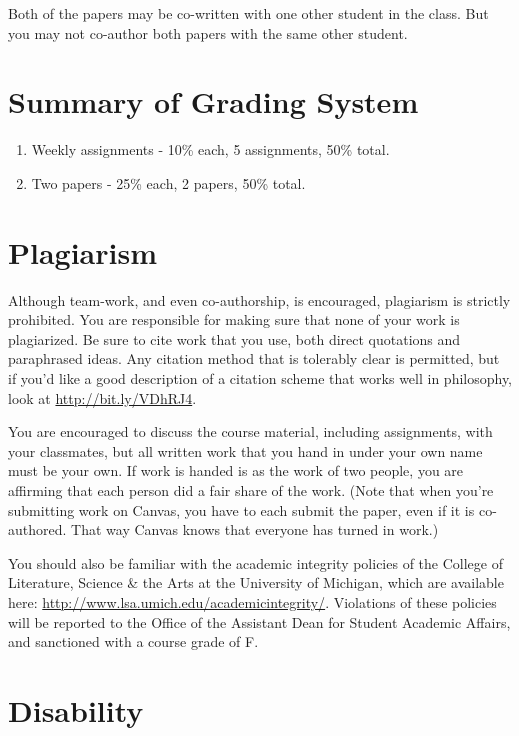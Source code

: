 \documentclass[
]{article}
\providecommand{\tightlist}{%
  \setlength{\itemsep}{0pt}\setlength{\parskip}{0pt}}
\begin{document}
Both of the papers may be co-written with one other student in the
class. But you may not co-author both papers with the same other
student.

\hypertarget{summary-of-grading-system}{%
\section{Summary of Grading System}\label{summary-of-grading-system}}

\begin{enumerate}
\def\labelenumi{\arabic{enumi}.}
\tightlist
\item
  Weekly assignments - 10\% each, 5 assignments, 50\% total.
\item
  Two papers - 25\% each, 2 papers, 50\% total.
\end{enumerate}

\newpage

\hypertarget{plagiarism}{%
\section{Plagiarism}\label{plagiarism}}

Although team-work, and even co-authorship, is encouraged, plagiarism is
strictly prohibited. You are responsible for making sure that none of
your work is plagiarized. Be sure to cite work that you use, both direct
quotations and paraphrased ideas. Any citation method that is tolerably
clear is permitted, but if you'd like a good description of a citation
scheme that works well in philosophy, look at
\url{http://bit.ly/VDhRJ4}.

You are encouraged to discuss the course material, including
assignments, with your classmates, but all written work that you hand in
under your own name must be your own. If work is handed is as the work
of two people, you are affirming that each person did a fair share of
the work. (Note that when you're submitting work on Canvas, you have to
each submit the paper, even if it is co-authored. That way Canvas knows
that everyone has turned in work.)

You should also be familiar with the academic integrity policies of the
College of Literature, Science \& the Arts at the University of
Michigan, which are available here:
\url{http://www.lsa.umich.edu/academicintegrity/}. Violations of these
policies will be reported to the Office of the Assistant Dean for
Student Academic Affairs, and sanctioned with a course grade of F.

\hypertarget{disability}{%
\section{Disability}\label{disability}}
\end{document}
